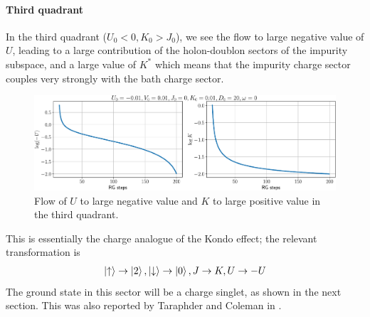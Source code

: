 \documentclass[twoside]{report}
\numberwithin{equation}{section}
\begin{document}
\paragraph*{Third quadrant}
In the third quadrant (\(U_0 < 0, K_0 > J_0\)), we see the flow to large negative value of \(U\), leading to a large contribution of the holon-doublon sectors of the impurity subspace, and a large value of \(K^*\) which means that the impurity charge sector couples very strongly with the bath charge sector.
\begin{figure}[htpb!]
\centering
\includegraphics[width=\textwidth]{../figures/with_V_q3_new.pdf}
\caption{Flow of \(U\) to large negative value and \(K\) to large positive value in the third quadrant.}
\label{frac_q3}
\end{figure}
This is essentially the charge analogue of the Kondo effect; the relevant transformation is
\begin{equation}\begin{aligned}
	\ket{\uparrow} \to \ket{2}, \ket{\downarrow} \to \ket{0}, J \to K, U \to -U
\end{aligned}\end{equation}
The ground state in this sector will be a charge singlet, as shown in the next section. This was also reported by Taraphder and Coleman in \cite{taraphder}.
\end{document}
